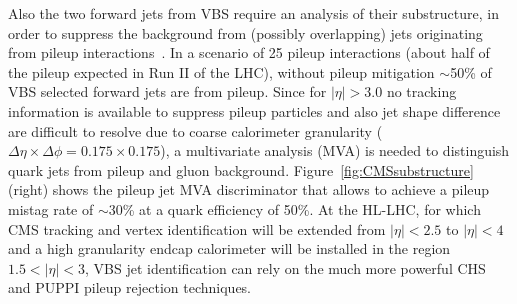 Also the two forward jets from VBS require an analysis of their substructure, in order to suppress the background from (possibly overlapping) jets originating from pileup interactions~\cite{CMS-PAS-JME-16-003, CMS-PAS-JME-13-005}.
In a scenario of 25 pileup interactions (about half of the pileup expected in Run II of the LHC), without pileup mitigation $\sim$50\% of VBS selected forward jets are from pileup.
Since for $|\eta|>3.0$ no tracking information is available to suppress pileup particles and also jet shape difference are difficult to resolve due to coarse calorimeter granularity ($\Delta \eta \times \Delta \phi = 0.175 \times 0.175$), a multivariate analysis (MVA) is needed to distinguish quark jets from pileup and gluon background.
Figure~\ref{fig:CMSsubstructure} (right) shows the pileup jet MVA discriminator that allows to achieve a pileup mistag rate of $\sim$30\% at a quark efficiency of 50\%.
At the HL-LHC, for which CMS tracking and vertex identification will be extended from $|\eta|<2.5$ to $|\eta|<4$ and a high granularity endcap calorimeter will be installed in the region $1.5<|\eta|<3$, VBS jet identification can rely on the much more powerful CHS and PUPPI pileup rejection techniques.
